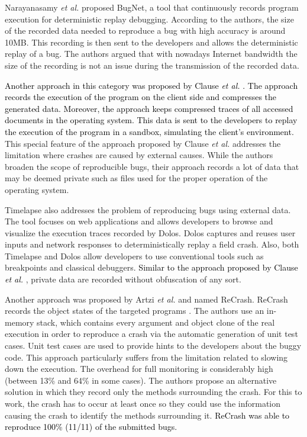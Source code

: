 \documentclass[times, doublespace]{smrauth}
\newcommand{\red}[1]{\textcolor{black}{#1}}
\begin{document}
Narayanasamy {\it et al.} \cite{Narayanasamy2005} proposed BugNet, a tool that continuously records program execution for deterministic replay debugging. According to the authors, the size of the recorded data needed to reproduce a bug with high accuracy is around 10MB. This recording is then sent to the developers and allows the deterministic replay of a bug. The authors argued that with nowadays Internet bandwidth the size of the recording is not an issue during the transmission of the recorded data.

\red{Another approach in this category was  proposed by Clause {\it et al.} \cite{Clause2007}. The approach records the execution of the program on the client side and compresses the generated data. Moreover, the approach keeps compressed traces of all accessed documents in the operating system.
This data is sent to the developers to replay the execution of the program in a sandbox, simulating the client's environment.}
This special feature of the approach proposed by Clause {\it et al.} addresses the limitation where crashes are caused by external causes. While the authors broaden the scope of reproducible bugs, their approach records a lot of data that may be deemed private such as files used for the proper operation of the operating system.

Timelapse \cite{Burg2013} also addresses the problem of reproducing bugs using external data. The tool focuses on web applications and allows developers to browse and visualize the execution traces recorded by Dolos. Dolos captures and reuses user inputs and network responses to deterministically replay a field crash. Also, both Timelapse and Dolos allow developers to use conventional tools such as breakpoints and classical debuggers. \red{Similar to the approach proposed by Clause {\it et al.} \cite{Clause2007}}, private data are recorded without obfuscation of any sort.

Another approach was proposed by Artzi {\it et al.} and named ReCrash. ReCrash records the object states of the targeted programs \cite{Artzi2008}. The authors use an in-memory stack, which contains every argument and object clone of the real execution in order to reproduce a crash via the automatic generation of unit test cases.
Unit test cases are used to provide hints to the developers about the buggy code.
This approach particularly suffers from the limitation related to slowing down the execution.
The overhead for full monitoring is considerably high (between 13\% and 64\% in some cases).
The authors  propose an alternative solution in which they record only the methods surrounding the crash. For this to work, the crash has to occur at least once so they could use the information causing the crash to identify the methods surrounding it. \red{ReCrash was able to reproduce 100\% (11/11) of the submitted bugs.}
\end{document}
